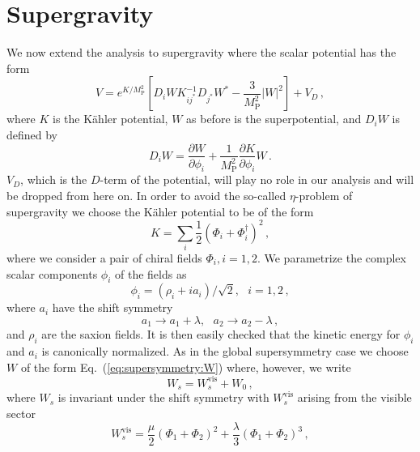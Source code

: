 \documentclass[11pt]{article}
\begin{document}
\section{Supergravity \label{sec:Supergravity}}
We now extend the analysis to supergravity where the scalar potential has the form~\cite{Chamseddine:1982jx, Cremmer:1982en}
\begin{equation} \label{eq:supergravity:potential}
  V = e^{K / M_\text{P}^2} \left[
    D_i W K^{-1}_{ij^*} D_{j^*} W^* - \frac{3}{M_\text{P}^2} \left|W\right|^2
  \right] + V_D\,,
\end{equation}
where $K$ is the K\"ahler potential, $W$ as before is the superpotential, and $D_i W$ is defined by
\begin{equation} \label{eq:supergravity:DW}
  D_i W = \frac{\partial W}{\partial \phi_i}
        + \frac{1}{M_\text{P}^2} \frac{\partial K}{\partial \phi_i} W\,.
\end{equation}
$V_D$, which is the $D$-term of the potential, will play no role in our analysis and will be dropped from here on.
In order to avoid the so-called $\eta$-problem of supergravity we choose the K\"ahler potential to be of the form
\begin{equation}
  K = \sum_i \frac{1}{2} \left(\Phi_i + \Phi_i^\dagger\right)^2\,,
\end{equation}
where we consider a pair of chiral fields $\Phi_i, i = 1, 2$.
We parametrize the complex scalar components $\phi_i$ of the fields as
\begin{equation}
  \phi_i = \left(\rho_i + i a_i\right) / \sqrt 2,
  ~~~ i = 1, 2\,,
\end{equation}
where $a_i$ have the shift symmetry
\begin{equation}
  a_1 \to a_1 + \lambda,
  ~~~ a_2 \to a_2 - \lambda\,,
\end{equation}
and $\rho_i$ are the saxion fields.
It is then easily checked that the kinetic energy for $\phi_i$ and $a_i$ is canonically normalized.
As in the global supersymmetry case we choose $W$ of the form Eq.~(\ref{eq:supersymmetry:W}) where, however, we write
\begin{equation}
  W_s = W_s^\text{vis} + W_0\,,
\end{equation}
where $W_s$ is invariant under the shift symmetry with $W_s^\text{vis}$ arising from the visible sector
\begin{equation}
  W_s^\text{vis} =
      \frac{\mu}{2} \left(\Phi_1 + \Phi_2\right)^2
    + \frac{\lambda}{3} \left(\Phi_1 + \Phi_2\right)^3\,,
\end{equation}
\end{document}

